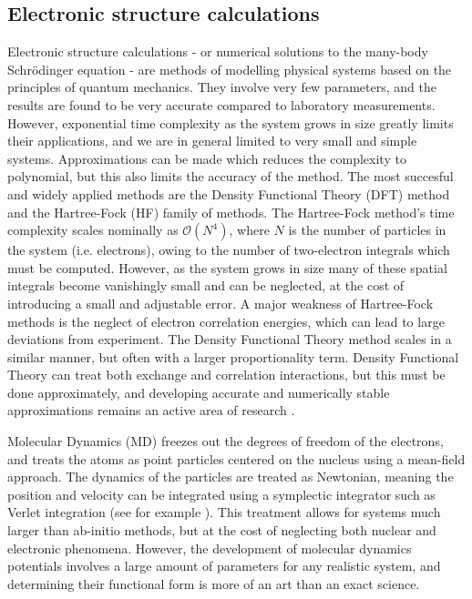 \subsection{Electronic structure calculations}
Electronic structure calculations - or numerical solutions
to the many-body Schr\"{o}dinger equation - are methods of modelling
physical systems based on the principles of quantum mechanics.
They involve very few parameters, and the results are found
to be very accurate compared to laboratory measurements.
However, exponential time complexity as the system grows in size
greatly limits their applications,
and we are in general limited to very small and simple systems.
Approximations can be made which reduces the complexity 
to polynomial, but this also limits the accuracy of the method.
The most succesful and widely applied methods
are the Density Functional Theory (DFT) method
and the Hartree-Fock (HF) family of methods.
The Hartree-Fock method's time complexity 
scales nominally as $\mathcal{O}(N^4)$,
where $N$ is the number of particles in the system
(i.e. electrons), owing to the number of two-electron
integrals which must be computed.
However, as the system grows in size many of these spatial integrals
become vanishingly small and can be neglected, at the cost of
introducing a small and adjustable error.
A major weakness of Hartree-Fock methods is the neglect
of electron correlation energies, which can lead to
large deviations from experiment.
The Density Functional Theory method scales in a similar
manner, but often with a larger proportionality term.
Density Functional Theory can treat both exchange and correlation
interactions, but this must be done approximately,
and developing accurate and numerically stable approximations
remains an active area of research \cite{gillan2016perspective}.
\par
Molecular Dynamics (MD) freezes out the degrees of freedom of the
electrons, and treats the atoms as point particles centered on
the nucleus using a mean-field approach.
The dynamics of the particles are treated as Newtonian,
meaning the position and velocity can be integrated using a
symplectic integrator such as Verlet integration
    (see for example \cite{martys1999velocity}).
This treatment allows for systems much larger
than ab-initio methods, but at the cost of neglecting
both nuclear and electronic phenomena.
However, the development of molecular dynamics potentials
involves a large amount of parameters for any realistic system,
and determining their functional form is more of an
art than an exact science.
\par
